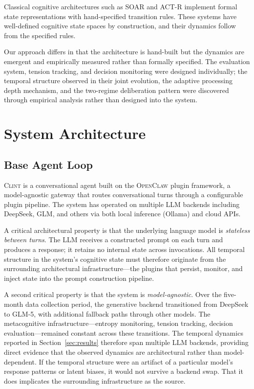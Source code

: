 \documentclass[twoside,11pt]{article}
\newcommand{\sys}{\textsc{Clint}}
\newcommand{\fw}{\textsc{OpenClaw}}
\begin{document}
Classical cognitive architectures such as SOAR \citep{laird1987soar} and ACT-R
\citep{anderson2004actr} implement formal state representations with
hand-specified transition rules. These systems have well-defined cognitive state
spaces by construction, and their dynamics follow from the specified rules.

Our approach differs in that the architecture is hand-built but the dynamics are
emergent and empirically measured rather than formally specified. The evaluation
system, tension tracking, and decision monitoring were designed individually;
the temporal structure observed in their joint evolution, the adaptive
processing depth mechanism, and the two-regime deliberation pattern were
discovered through empirical analysis rather than designed into the system.


\section{System Architecture}
\label{sec:architecture}

\subsection{Base Agent Loop}
\label{sec:arch-base}

\sys{} is a conversational agent built on the \fw{} plugin framework, a
model-agnostic gateway that routes conversational turns through a configurable
plugin pipeline. The system has operated on multiple LLM backends including
DeepSeek, GLM, and others via both local inference (Ollama) and cloud APIs.

A critical architectural property is that the underlying language model is
\emph{stateless between turns}. The LLM receives a constructed prompt on each
turn and produces a response; it retains no internal state across invocations.
All temporal structure in the system's cognitive state must therefore originate
from the surrounding architectural infrastructure---the plugins that persist,
monitor, and inject state into the prompt construction pipeline.

A second critical property is that the system is \emph{model-agnostic}. Over
the five-month data collection period, the generative backend transitioned from
DeepSeek to GLM-5, with additional fallback paths through other models. The
metacognitive infrastructure---entropy monitoring, tension tracking, decision
evaluation---remained constant across these transitions. The temporal dynamics
reported in Section~\ref{sec:results} therefore span multiple LLM backends,
providing direct evidence that the observed dynamics are architectural rather
than model-dependent. If the temporal structure were an artifact of a particular
model's response patterns or latent biases, it would not survive a backend swap.
That it does implicates the surrounding infrastructure as the source.
\end{document}

